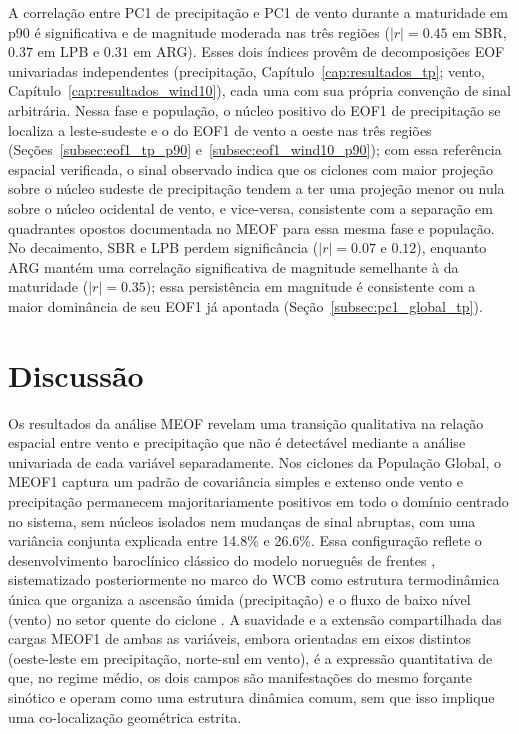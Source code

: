 A correlação entre PC1 de precipitação e PC1 de vento durante a maturidade em p90 é significativa e de magnitude moderada nas três regiões ($|r| = 0.45$ em SBR, $0.37$ em LPB e $0.31$ em ARG). Esses dois índices provêm de decomposições EOF univariadas independentes (precipitação, Capítulo~\ref{cap:resultados_tp}; vento, Capítulo~\ref{cap:resultados_wind10}), cada uma com sua própria convenção de sinal arbitrária. Nessa fase e população, o núcleo positivo do EOF1 de precipitação se localiza a leste-sudeste e o do EOF1 de vento a oeste nas três regiões (Seções~\ref{subsec:eof1_tp_p90} e~\ref{subsec:eof1_wind10_p90}); com essa referência espacial verificada, o sinal observado indica que os ciclones com maior projeção sobre o núcleo sudeste de precipitação tendem a ter uma projeção menor ou nula sobre o núcleo ocidental de vento, e vice-versa, consistente com a separação em quadrantes opostos documentada no MEOF para essa mesma fase e população. No decaimento, SBR e LPB perdem significância ($|r|=0.07$ e $0.12$), enquanto ARG mantém uma correlação significativa de magnitude semelhante à da maturidade ($|r|=0.35$); essa persistência em magnitude é consistente com a maior dominância de seu EOF1 já apontada (Seção~\ref{subsec:pc1_global_tp}).

\section{Discussão}
\label{sec:discusion_meof}

Os resultados da análise MEOF revelam uma transição qualitativa na relação espacial entre vento e precipitação que não é detectável mediante a análise univariada de cada variável separadamente.
Nos ciclones da População Global, o MEOF1 captura um padrão de covariância simples e extenso onde vento e precipitação permanecem majoritariamente positivos em todo o domínio centrado no sistema, sem núcleos isolados nem mudanças de sinal abruptas, com uma variância conjunta explicada entre 14.8\% e 26.6\%. Essa configuração reflete o desenvolvimento baroclínico clássico do modelo norueguês de frentes \citep{bjerknes1922life}, sistematizado posteriormente no marco do WCB como estrutura termodinâmica única que organiza a ascensão úmida (precipitação) e o fluxo de baixo nível (vento) no setor quente do ciclone \citep{browning1986conceptual}.
A suavidade e a extensão compartilhada das cargas MEOF1 de ambas as variáveis, embora orientadas em eixos distintos (oeste-leste em precipitação, norte-sul em vento), é a expressão quantitativa de que, no regime médio, os dois campos são manifestações do mesmo forçante sinótico e operam como uma estrutura dinâmica comum, sem que isso implique uma co-localização geométrica estrita.

